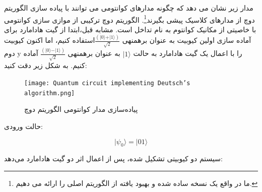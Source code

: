\documentclass{book}
\begin{document}
مدار زیر نشان می دهد که چگونه مدارهای کوانتومی می توانند با پیاده سازی الگوریتم دوچ از مدارهای کلاسیک پیشی بگیرند\footnote{ما در واقع یک نسخه ساده شده و بهبود یافته از الگوریتم اصلی را ارائه می دهیم.}. الگوریتم دوچ ترکیبی از موازی سازی کوانتومی با خاصیتی از مکانیک کوانتوم به نام تداخل است.
مشابه قبل،‌ابتدا از گیت هادامارد برای آماده سازی اولین کیوبیت به عنوان برهمنهی $\frac{(\vert 0 \rangle + \vert 1 \rangle)}{\sqrt{2}}$استفاده کنیم، اما اکنون کیوبیت دوم y را با اعمال یک گیت هادامارد به حالت $\vert 1 \rangle$ به عنوان برهمنهی $\frac{(\vert 0 \rangle - \vert 1 \rangle)}{\sqrt{2}}$ آماده کنیم. به‌ شکل زیر دقت کنید:



\begin{figure}[ht]
	\centering
	\texttt{[image: Quantum circuit implementing Deutsch’s algorithm.png]}
	\caption{پیاده‌سازی مدار کوانتومی‌ الگوریتم دوچ}
\end{figure}
حالت ورودی:\\
\begin{center}
	\begin{equation}\label{zero state deutsch}
		\vert\psi_{0}\rangle = \vert01\rangle
	\end{equation}
\end{center}

سیستم دو کیوبیتی تشکیل شده،‌ پس از اعمال اثر دو گیت هادامارد می‌دهد:\\
\end{document}
